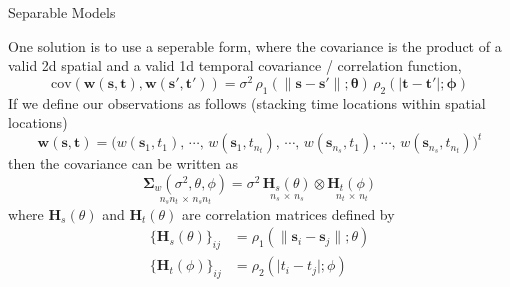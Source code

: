 \documentclass[11pt,ignorenonframetext,]{beamer}
\begin{document}
\begin{frame}{Separable Models}
\protect\hypertarget{separable-models}{}

One solution is to use a seperable form, where the covariance is the
product of a valid 2d spatial and a valid 1d temporal covariance /
correlation function, \[
\text{cov}(\symbf{w}(\symbf{s},\symbf{t}), \symbf{w}(\symbf{s}',\symbf{t}')) = \sigma^2 \, \rho_1(\lVert \symbf{s}-\symbf{s}'\rVert;\symbf{\theta}) \, \rho_2(\lvert \symbf{t}-\symbf{t}' \rvert; \symbf{\phi})
\] \pause If we define our observations as follows (stacking time
locations within spatial locations) \footnotesize \[
\symbf{w}(\symbf{s},\symbf{t}) = \big(
  w(\symbf{s}_1,t_1)     ,\, \cdots ,\, w(\symbf{s}_1,t_{n_t}) ,\,
  \cdots ,\,
  w(\symbf{s}_{n_s},t_1) ,\, \cdots ,\, w(\symbf{s}_{n_s},t_{n_t}) \big)^t
\] \normalsize then the covariance can be written as \footnotesize \[
\underset{n_s n_t \,\times\, n_s n_t}{\symbf{\Sigma}_w(\sigma^2, \theta, \phi)} = \sigma^2 \, \underset{n_s \,\times\, n_s}{\symbf{H}_s(\theta)} \otimes \underset{n_t \,\times\, n_t}{\symbf{H}_t(\phi)}
\] \normalsize where \(\symbf{H}_s(\theta)\) and \(\symbf{H}_t(\theta)\)
are correlation matrices defined by \footnotesize \[
\begin{aligned}
\{\symbf{H}_s(\theta)\}_{ij} &= \rho_1(\lVert \symbf{s}_i - \symbf{s}_j \rVert; \theta) \\
\{\symbf{H}_t(\phi)\}_{ij} &= \rho_2(\lvert t_i - t_j \rvert; \phi) \\
\end{aligned}
\]

\end{frame}
\end{document}
